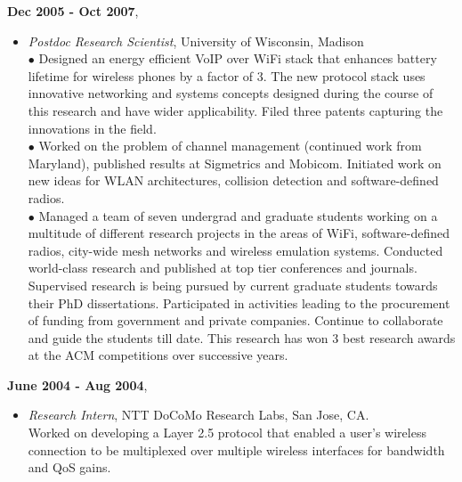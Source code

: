 \begin{resume}
{\bf Dec 2005 - Oct 2007},
    \begin{itemize}
         \item[] {\it Postdoc Research Scientist}, University of Wisconsin, Madison\\
	        $\bullet$ Designed an energy efficient VoIP over WiFi stack that
		enhances battery lifetime for wireless phones by a factor of 3.
		The new protocol stack uses innovative networking and systems
		concepts designed during the course of this research and have
		wider applicability. Filed three patents capturing the
		innovations in the field.\\
		$\bullet$ Worked on the problem of channel management (continued work from Maryland), published
		results at Sigmetrics and Mobicom. Initiated work on new ideas for WLAN architectures, collision detection and software-defined radios.\\
                $\bullet$ Managed a team of seven undergrad and graduate students working on a multitude of different research
projects  in the areas of WiFi, software-defined radios, city-wide mesh
networks and wireless emulation systems. Conducted world-class research and
published at top tier conferences and journals. Supervised research is being
pursued by current graduate students towards their PhD dissertations. Participated in activities
leading to the procurement of funding from government and private companies. Continue to collaborate and guide the
students till date. This research has won 3 best research awards at the ACM competitions over successive years.
    \end{itemize}

 {\bf June 2004 - Aug 2004},   	
    \begin{itemize}
         \item[] {\it Research Intern},  NTT DoCoMo Research Labs, San Jose, CA.\\
		 Worked on developing a Layer 2.5 protocol that enabled a user's wireless connection to be
                 multiplexed over multiple wireless interfaces for bandwidth and QoS gains.
		 


\end{itemize}
\end{resume}
